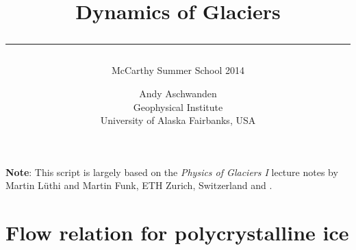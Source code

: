 \documentclass[11pt,DIV12,a4paper,halfparskip]{scrartcl}
\begin{document}
\title{Dynamics of Glaciers\\[.5em]
\rule[1.em]{\textwidth}{2pt}
\subtitle{McCarthy Summer School 2014}}

\date{}

\author{
  \small Andy Aschwanden\\[-.5em] 
  \small Geophysical Institute\\[-.5em] 
  \small University of Alaska Fairbanks, USA}


\maketitle

{\bf Note}: This script is largely based on the \emph{Physics of
Glaciers I} lecture notes by Martin L\"uthi and Martin Funk, ETH
Zurich, Switzerland and \cite{GreveBlatter_disg}.

\vspace{1em}

\section{Flow relation for polycrystalline ice}
\label{sec:flow-law-ice}
\end{document}
